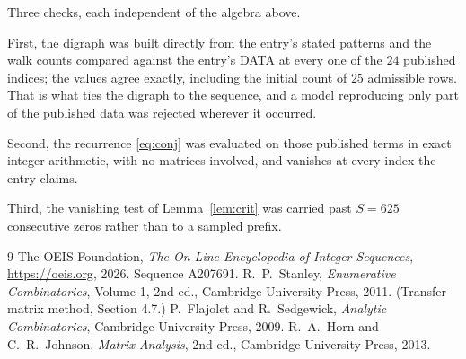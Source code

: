\documentclass[11pt,a4paper]{article}
\theoremstyle{plain}
\theoremstyle{definition}
\begin{document}
Three checks, each independent of the algebra above.

First, the digraph was built directly from the entry's stated patterns and the walk counts
compared against the entry's DATA at every one of the $24$ published indices; the
values agree exactly, including the initial count of $25$ admissible rows. That is
what ties the digraph to the sequence, and a model reproducing only part of the published
data was rejected wherever it occurred.

Second, the recurrence \eqref{eq:conj} was evaluated on those published terms in exact
integer arithmetic, with no matrices involved, and vanishes at every index the entry claims.

Third, the vanishing test of Lemma~\ref{lem:crit} was carried past $S=625$ consecutive
zeros rather than to a sampled prefix.

\begin{thebibliography}{9}
 The OEIS Foundation, \emph{The On-Line Encyclopedia of Integer
Sequences}, \url{https://oeis.org}, 2026. Sequence A207691.
 R.~P.~Stanley, \emph{Enumerative Combinatorics}, Volume 1, 2nd ed.,
Cambridge University Press, 2011. (Transfer-matrix method, Section 4.7.)
 P.~Flajolet and R.~Sedgewick, \emph{Analytic Combinatorics}, Cambridge
University Press, 2009.
 R.~A.~Horn and C.~R.~Johnson, \emph{Matrix Analysis}, 2nd ed., Cambridge
University Press, 2013.
\end{thebibliography}
\end{document}
